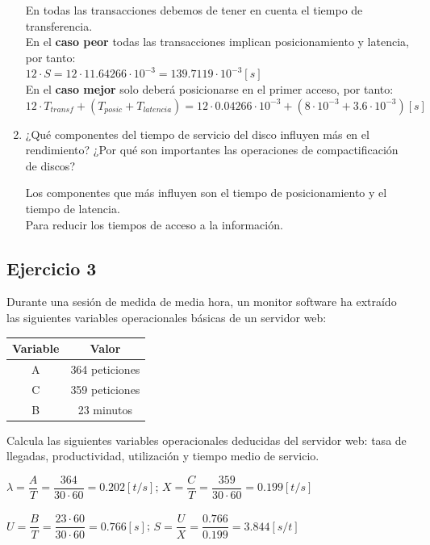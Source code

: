 \begin{enumerate}
\begin{tcolorbox}[colback=white,colframe=cyan!50!black,fonttitle=\bfseries]
    En todas las transacciones debemos de tener en cuenta el tiempo de transferencia.\\
    En el \textbf{caso peor} todas las transacciones implican posicionamiento y latencia, por tanto:\\
    $12\cdot S=12\cdot11.64266\cdot10^{-3}=139.7119\cdot10^{-3}[s]$\\
    En el \textbf{caso mejor} solo deberá posicionarse en el primer acceso, por tanto:\\
    $12\cdot T_{transf}+(T_{posic}+T_{latencia})=12\cdot0.04266\cdot10^{-3}+(8\cdot10^{-3}+3.6\cdot10^{-3})[s]$
    \end{tcolorbox}
    \item ¿Qué componentes del tiempo de servicio del disco influyen más en el rendimiento? ¿Por qué son importantes las operaciones de compactificación de discos?
    \begin{tcolorbox}[colback=white,colframe=cyan!50!black,fonttitle=\bfseries]
    Los componentes que más influyen son el tiempo de posicionamiento y el tiempo de latencia.\\Para reducir los tiempos de acceso a la información.
    \end{tcolorbox}
\end{enumerate}

\subsection{Ejercicio 3}
Durante una sesión de medida de media hora, un monitor software ha extraído las siguientes variables operacionales básicas de un servidor web:

\begin{table}[H]\centering
\begin{tabular}{|c|c|}
\hline
\textbf{Variable} & \textbf{Valor}          \\ \hline
A        & 364 peticiones \\ \hline
C        & 359 peticiones \\ \hline
B        & 23 minutos     \\ \hline
\end{tabular}
\end{table}
Calcula las siguientes variables operacionales deducidas del servidor web: tasa de llegadas, productividad, utilización y tiempo medio de servicio.
\begin{tcolorbox}[colback=white,colframe=cyan!50!black,fonttitle=\bfseries]
$\lambda = \dfrac{A}{T} = \dfrac{364}{30\cdot60}=0.202[t/s]$; 
$X = \dfrac{C}{T}=\dfrac{359}{30\cdot60}=0.199[t/s]$\\\\
$U = \dfrac{B}{T}=\dfrac{23\cdot60}{30\cdot60}=0.766[s]$; 
$S = \dfrac{U}{X}=\dfrac{0.766}{0.199}=3.844[s/t]$
\end{tcolorbox}
